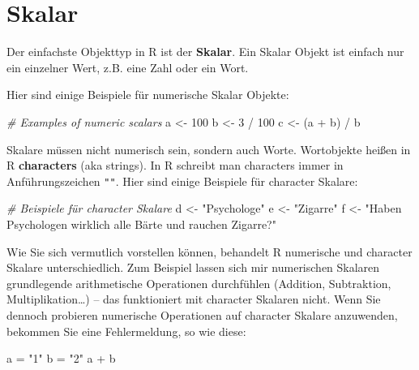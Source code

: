 \documentclass[
]{book}
\newenvironment{Shaded}{\begin{snugshade}}{\end{snugshade}}
\newcommand{\CommentTok}[1]{\textcolor[rgb]{0.56,0.35,0.01}{\textit{#1}}}
\newcommand{\DecValTok}[1]{\textcolor[rgb]{0.00,0.00,0.81}{#1}}
\newcommand{\NormalTok}[1]{#1}
\newcommand{\OtherTok}[1]{\textcolor[rgb]{0.56,0.35,0.01}{#1}}
\newcommand{\SpecialCharTok}[1]{\textcolor[rgb]{0.00,0.00,0.00}{#1}}
\newcommand{\StringTok}[1]{\textcolor[rgb]{0.31,0.60,0.02}{#1}}
\begin{document}
\hypertarget{skalar}{%
\section{Skalar}\label{skalar}}

Der einfachste Objekttyp in R ist der \textbf{Skalar}. Ein Skalar Objekt ist einfach nur ein einzelner Wert, z.B. eine Zahl oder ein Wort.

Hier sind einige Beispiele für numerische Skalar Objekte:

\begin{Shaded}
\begin{Highlighting}[]
\CommentTok{\# Examples of numeric scalars}
\NormalTok{a }\OtherTok{\textless{}{-}} \DecValTok{100}
\NormalTok{b }\OtherTok{\textless{}{-}} \DecValTok{3} \SpecialCharTok{/} \DecValTok{100}
\NormalTok{c }\OtherTok{\textless{}{-}}\NormalTok{ (a }\SpecialCharTok{+}\NormalTok{ b) }\SpecialCharTok{/}\NormalTok{ b}
\end{Highlighting}
\end{Shaded}

Skalare müssen nicht numerisch sein, sondern auch Worte. Wortobjekte heißen in R \textbf{characters} (aka strings). In R schreibt man characters immer in Anführungszeichen \texttt{""}. Hier sind einige Beispiele für character Skalare:

\begin{Shaded}
\begin{Highlighting}[]
\CommentTok{\# Beispiele für character Skalare}
\NormalTok{d }\OtherTok{\textless{}{-}} \StringTok{"Psychologe"}
\NormalTok{e }\OtherTok{\textless{}{-}} \StringTok{"Zigarre"}
\NormalTok{f }\OtherTok{\textless{}{-}} \StringTok{"Haben Psychologen wirklich alle Bärte und rauchen Zigarre?"}
\end{Highlighting}
\end{Shaded}

Wie Sie sich vermutlich vorstellen können, behandelt R numerische und character Skalare unterschiedlich. Zum Beispiel lassen sich mir numerischen Skalaren grundlegende arithmetische Operationen durchfühlen (Addition, Subtraktion, Multiplikation\ldots) -- das funktioniert mit character Skalaren nicht.
Wenn Sie dennoch probieren numerische Operationen auf character Skalare anzuwenden, bekommen Sie eine Fehlermeldung, so wie diese:

\begin{Shaded}
\begin{Highlighting}[]
\NormalTok{a }\OtherTok{=} \StringTok{"1"}
\NormalTok{b }\OtherTok{=} \StringTok{"2"}
\NormalTok{a }\SpecialCharTok{+}\NormalTok{ b}
\end{Highlighting}
\end{Shaded}
\end{document}
